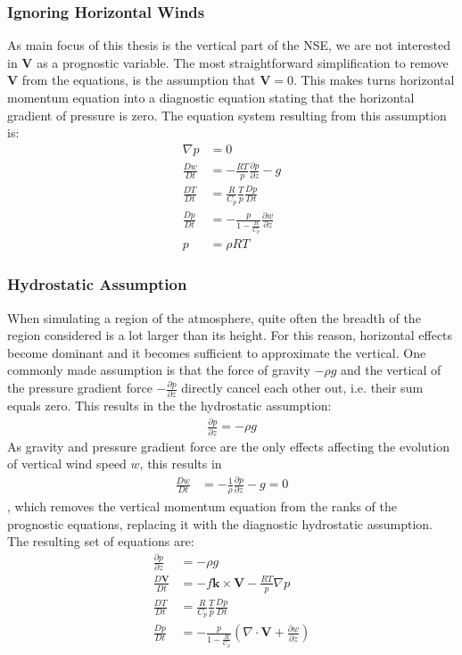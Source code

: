 \subsubsection{Ignoring Horizontal Winds}\label{subsec_horizon}
As main focus of this thesis is the vertical part of the NSE, we are not interested in $\textbf{V}$ as a prognostic variable.
The most straightforward simplification to remove $\textbf{V}$ from the equations, is the assumption that $\textbf{V}=0$.
This makes turns horizontal momentum equation into a diagnostic equation stating that the horizontal gradient of pressure is zero.
The equation system resulting from this assumption is:
\begin{align*}
\nabla p &= 0\\
\frac{Dw}{Dt} &= - \frac{RT}{p} \frac{\partial p}{\partial z} - g \\
\frac{DT}{Dt} &= \frac{R}{C_p}\frac{T}{p}\frac{Dp}{Dt}\\
\frac{Dp}{Dt} &= -\frac{p}{1- \frac{R}{C_p}} \frac{\partial w}{\partial z}\\
p &= \rho R T
\end{align*}


\subsubsection{Hydrostatic Assumption}\label{subsec_hydrostat}
When simulating a region of the atmosphere, quite often the breadth of the region considered is a lot larger than its height.
For this reason, horizontal effects become dominant and it becomes sufficient to approximate the vertical.
One commonly made assumption is that the force of gravity $-\rho g$ and the vertical of the pressure gradient force $-\frac{\partial p}{\partial z}$ directly cancel each other out, i.e. their sum equals zero.
This results in the the hydrostatic assumption:
\begin{align}\label{eq_hydrostat_assump}
\frac{\partial p}{\partial z} = -\rho g 
\end{align}
As gravity and pressure gradient force are the only effects affecting the evolution of vertical wind speed $w$, this results in
\begin{align*}
\frac{Dw}{Dt} &= - \frac{1}{\rho} \frac{\partial p}{\partial z} - g = 0
\end{align*},
which removes the vertical momentum equation from the ranks of the prognostic equations, replacing it with the diagnostic hydrostatic assumption.
The resulting set of equations are:
\begin{align*}
\frac{\partial p}{\partial z} &= -\rho g \\
\frac{D\textbf{V}}{Dt} &= -f\boldsymbol{k} \times \textbf{V} - \frac{RT}{p}\nabla p\\
\frac{DT}{Dt} &= \frac{R}{C_p}\frac{T}{p}\frac{Dp}{Dt}\\
\frac{Dp}{Dt} &= -\frac{p}{1- \frac{R}{C_p}} \left(\nabla \cdot \textbf{V} + \frac{\partial w}{\partial z}\right)\\
\end{align*}


